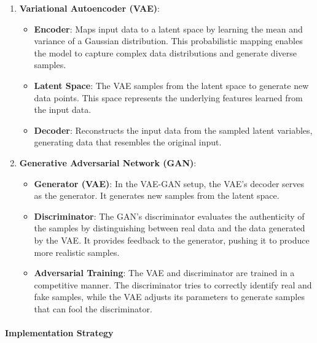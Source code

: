 \documentclass[11pt]{article}
\providecommand{\tightlist}{%
      \setlength{\itemsep}{0pt}\setlength{\parskip}{0pt}}
\begin{document}
\begin{enumerate}
\def\labelenumi{\arabic{enumi}.}
\tightlist
\item
  \textbf{Variational Autoencoder (VAE)}:

  \begin{itemize}
  \tightlist
  \item
    \textbf{Encoder}: Maps input data to a latent space by learning the
    mean and variance of a Gaussian distribution. This probabilistic
    mapping enables the model to capture complex data distributions and
    generate diverse samples.
  \item
    \textbf{Latent Space}: The VAE samples from the latent space to
    generate new data points. This space represents the underlying
    features learned from the input data.
  \item
    \textbf{Decoder}: Reconstructs the input data from the sampled
    latent variables, generating data that resembles the original input.
  \end{itemize}
\item
  \textbf{Generative Adversarial Network (GAN)}:

  \begin{itemize}
  \tightlist
  \item
    \textbf{Generator (VAE)}: In the VAE-GAN setup, the VAE's decoder
    serves as the generator. It generates new samples from the latent
    space.
  \item
    \textbf{Discriminator}: The GAN's discriminator evaluates the
    authenticity of the samples by distinguishing between real data and
    the data generated by the VAE. It provides feedback to the
    generator, pushing it to produce more realistic samples.
  \item
    \textbf{Adversarial Training}: The VAE and discriminator are trained
    in a competitive manner. The discriminator tries to correctly
    identify real and fake samples, while the VAE adjusts its parameters
    to generate samples that can fool the discriminator.
  \end{itemize}
\end{enumerate}

\paragraph{Implementation Strategy}\label{implementation-strategy}
\end{document}
